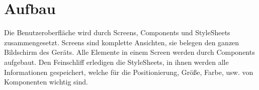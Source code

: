 \chapter{Aufbau}
Die Benutzeroberfläche wird durch Screens, Components und StyleSheets zusammengesetzt. Screens sind
komplette Ansichten, sie belegen den ganzen Bildschirm des Geräts. Alle Elemente in einem Screen
werden durch Components aufgebaut. Den Feinschliff erledigen die StyleSheets, in ihnen werden alle
Informationen gespeichert, welche für die Positionierung, Größe, Farbe, usw. von Komponenten wichtig
sind.



\newpage


